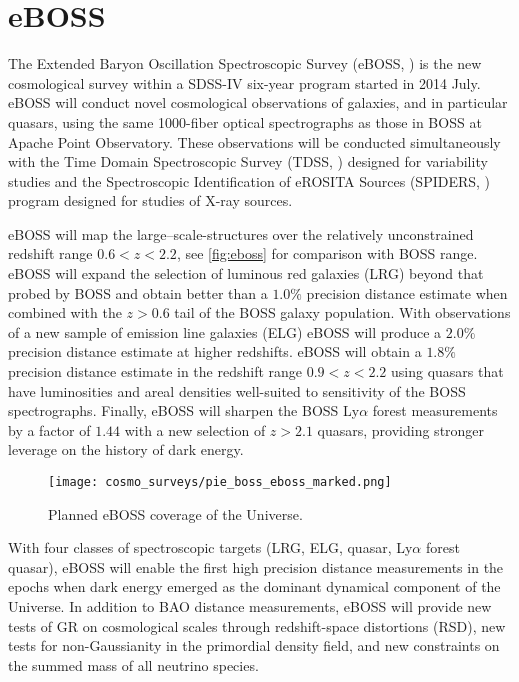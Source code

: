 \section{eBOSS}
The Extended Baryon Oscillation Spectroscopic Survey (eBOSS, \cite{2016AJ....151...44D}) is the new cosmological survey within a SDSS-IV six-year program started in 2014 July. eBOSS will conduct novel cosmological observations of galaxies, and in particular quasars, using the same 1000-fiber optical spectrographs as those in BOSS at Apache Point Observatory. These observations will be conducted simultaneously with the Time Domain Spectroscopic Survey (TDSS, \cite{2015ApJ...806..244M}) designed for variability studies and the Spectroscopic Identification of eROSITA Sources (SPIDERS, \cite{2010SPIE.7741E..1NF}) program designed for studies of X-ray sources.

eBOSS will map the large--scale-structures over the relatively unconstrained redshift range $0.6<z< 2.2$, see \autoref{fig:eboss} for comparison with BOSS range. eBOSS will expand the selection of luminous red galaxies (LRG) beyond that probed by BOSS and obtain better than a $1.0\%$ precision distance estimate when combined with the $z > 0.6$ tail of the BOSS galaxy population. With observations of a new sample of emission line galaxies (ELG) eBOSS will produce a $2.0\%$ precision distance estimate at higher redshifts. eBOSS will obtain a $1.8\%$ precision distance estimate in the redshift range $0.9 < z < 2.2$ using quasars that have luminosities and areal densities well-suited to sensitivity of the BOSS spectrographs. Finally, eBOSS will sharpen the BOSS Ly$\alpha$ forest measurements by a factor of $1.44$ with a new selection of $z > 2.1$ quasars, providing stronger leverage on the history of dark energy.
\begin{figure}[htb]
    \centering
    \texttt{[image: cosmo\_surveys/pie\_boss\_eboss\_marked.png]}
    \caption{Planned eBOSS coverage of the Universe.}
    \label{fig:eboss}
\end{figure}

With four classes of spectroscopic targets (LRG, ELG, quasar, Ly$\alpha$ forest quasar), eBOSS will enable the first high precision distance measurements in the epochs when dark energy emerged as the dominant dynamical component of the Universe. In addition to BAO distance measurements, eBOSS will provide new tests of GR on cosmological scales through redshift-space distortions (RSD), new tests for non-Gaussianity in the primordial density field, and new constraints on the summed mass of all neutrino species.
